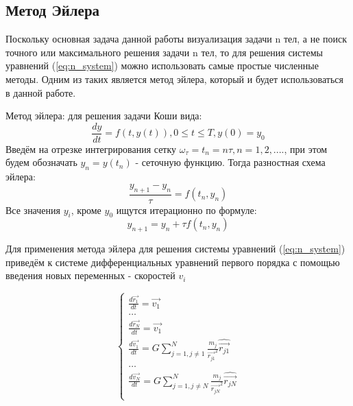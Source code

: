 \subsection{Метод Эйлера}
Поскольку основная задача данной работы визуализация задачи n тел, а не поиск точного или максимального решения задачи n тел, то для решения системы уравнений (\ref{eq:n_system}) можно использовать самые простые численные методы. Одним из таких является метод эйлера, который и будет использоваться в данной работе.

Метод эйлера: для решения задачи Коши вида:
\begin{equation}
	\label{eq:koshi}
	\frac{dy}{dt} = f(t, y(t)), 0 \leq t \leq T, y(0) = y_0
\end{equation}
Введём на отрезке интегрирования сетку $\omega_\tau = {t_n = n\tau, n = 1,2,....}$, при этом будем обозначать $y_n = y(t_n)$  - сеточную функцию.
Тогда разностная схема эйлера:
\begin{equation}
	\label{eq:euler_frac}
	\frac{y_{n+1} - y_n}{\tau} = f(t_n, y_n)
\end{equation}
Все значения $y_i$, кроме $y_0$ ищутся итерационно по формуле:
\begin{equation}
	\label{eq:euler_formula}
	y_{n+1} = y_n + \tau f(t_n, y_n)
\end{equation}

Для применения метода эйлера для решения системы уравнений (\ref{eq:n_system}) приведём к системе дифференциальных уравнений первого порядка с помощью введения новых переменных - скоростей $v_i$ 

\begin{equation}
	\label{n_system_velocities}
	\begin{cases}
		\frac{d\vec{r_1}}{dt} = \vec{v_1} \\
		\dots \\
		\frac{d\vec{r_N}}{dt} = \vec{v_1} \\
		
		\frac{d\vec{v_1}}{dt} = G\sum_{j=1, j \neq 1}^{N}{\frac{m_j}{\vec{r_{j1}}^2}\hat{\vec{r_{j1}}}} \\
		\dots \\
		\frac{d\vec{v_N}}{dt} = G\sum_{j=1, j \neq N}^{N}{\frac{m_j}{\vec{r_{jN}}^2}\hat{\vec{r_{jN}}}} \\
	\end{cases}
\end{equation}

